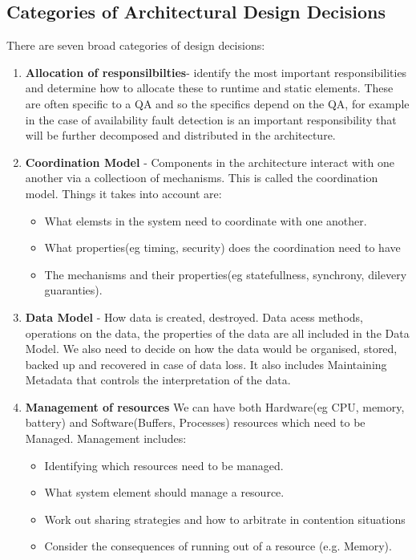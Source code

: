 \documentclass[a4paper]{report}
\begin{document}
\subsection{Categories of Architectural Design Decisions}
There are seven broad categories of design decisions:
\begin{enumerate}
\item \textbf{Allocation of responsilbilties}- identify the most important responsibilities and determine how to allocate these to runtime and static elements.
These are often specific to a QA and so the specifics depend on the QA, for example in the case of availability fault detection is an important responsibility that will be further decomposed and distributed in the architecture.
\item \textbf{Coordination Model} - Components in the architecture interact with one another via a collectioon of mechanisms. This is called the coordination model. Things it takes into account are:
\begin{itemize}
\item What elemsts in the system need to coordinate with one another.
\item What properties(eg timing, security) does the coordination need to have
\item The mechanisms and their properties(eg statefullness, synchrony, dilevery guaranties).
\end{itemize}
\item \textbf{Data Model} - How data is created, destroyed. Data acess methods, operations on the data, the properties of the data are all included in the Data Model. We also need to decide on how the data would be organised, stored, backed up and recovered in case of data loss. It also includes Maintaining Metadata that controls the interpretation of the data.

\item \textbf{Management of resources} We can have both Hardware(eg CPU, memory, battery) and Software(Buffers, Processes) resources which need to be Managed. Management includes:
\begin{itemize}
\item Identifying which resources need to be managed.
\item What system element should manage a resource.
\item Work out sharing strategies and how to arbitrate in contention situations
\item Consider the consequences of running out of a resource (e.g. Memory).
\end{itemize}


\end{enumerate}
\end{document}
